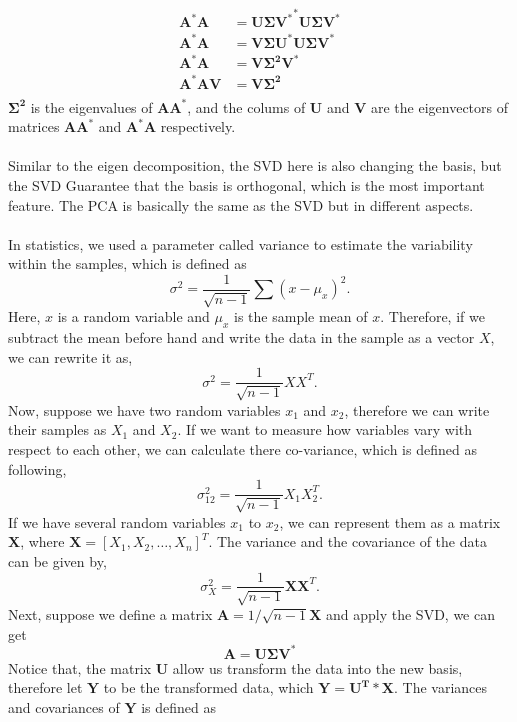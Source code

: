 \documentclass{article}
\begin{document}
\begin{equation}
    \begin{aligned}
    \mathbf{A^{*}A} &=\mathbf{U\Sigma V^*}^*\mathbf{U\Sigma V^*}\\
    \mathbf{A^{*}A} &=\mathbf{V\Sigma U^*}\mathbf{U\Sigma V^*}\\
    \mathbf{A^{*}A} &=\mathbf{V\Sigma^2  V^*}\\
    \mathbf{A^{*}AV} &=\mathbf{V\Sigma^2}\\
    \end{aligned}
\end{equation}
$\mathbf{\Sigma^2}$ is the eigenvalues of $\mathbf{AA^{*}}$, and the colums of $\mathbf{U}$ and $\mathbf{V}$ are the eigenvectors of matrices $\mathbf{AA^{*}}$ and $\mathbf{A^{*}A}$ respectively. \\
~\\
Similar to the eigen decomposition, the SVD here is also changing the basis, but the SVD Guarantee that the basis is orthogonal, which is the most important feature. The PCA is basically the same as the SVD but in different aspects. \\
~\\
In statistics, we used a parameter called variance to estimate the variability within the samples, which is defined as
\[
\sigma^2 = \frac{1}{\sqrt{n-1}}\sum (x-\mu_x)^2.
\]
Here, $x$ is a random variable and $\mu_x$ is the sample mean of $x$. Therefore, if we subtract the mean before hand and write the data in the sample as a vector $X$, we can rewrite it as,
\[
\sigma^2 = \frac{1}{\sqrt{n-1}}XX^T.
\]
Now, suppose we have two random variables $x_1$ and $x_2$, therefore we can write their samples as $X_1$ and $X_2$. If we want to measure how variables vary with respect to each other, we can calculate there co-variance, which is defined as following,
\[
\sigma_{12}^2 = \frac{1}{\sqrt{n-1}}X_1X_2^T.
\]
If we have several random variables $x_1$ to $x_2$, we can represent them as a matrix $\mathbf{X}$, where $\mathbf{X}=[X_1, X_2, \dots, X_n]^T$. The variance and the covariance of the data can be given by,
\[
\sigma_X^2 = \frac{1}{\sqrt{n-1}}\mathbf{X}\mathbf{X}^T.
\]
Next, suppose we define a matrix $\mathbf{A}=1/\sqrt{n-1}\mathbf{X}$ and apply the SVD, we can get
\[
\mathbf{A} = \mathbf{U\Sigma V^*}
\]
Notice that, the matrix $\mathbf{U}$ allow us transform the data into the new basis, therefore let $\mathbf{Y}$ to be the transformed data, which  $\mathbf{Y} = \mathbf{U^T*X}$. The variances and covariances of $\mathbf{Y}$ is defined as
\end{document}
